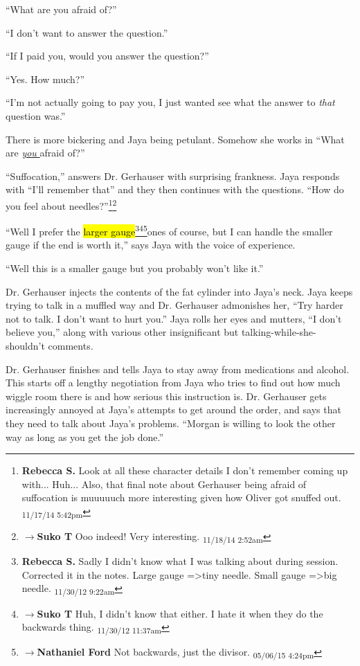 ``What are you afraid of?''

``I don't want to answer the question.''

``If I paid you, would you answer the question?''

``Yes.  How much?''

``I'm not actually going to pay you, I just wanted see what the answer to \textit{that} question was.''

There is more bickering and Jaya being petulant.  Somehow she works in ``What are \underline{\textit{you} } afraid of?''

``Suffocation,'' answers Dr. Gerhauser with surprising frankness.  Jaya responds with ``I'll remember that'' and they then continues with the questions.  ``How do you feel about needles?''\footnote{\textbf{Rebecca S. }Look at all these character details I don't remember coming up with... Huh... 
Also, that final note about Gerhauser being afraid of suffocation is muuuuuch more interesting given how Oliver got snuffed out. \textsubscript{11/17/14 5:42pm}}\footnote{$\rightarrow$\textbf{Suko T }Ooo indeed!  Very interesting. \textsubscript{11/18/14 2:52am}}

``Well I prefer the \hl{larger gauge}\footnote{\textbf{Rebecca S. }Sadly I didn't know what I was talking about during session.  Corrected it in the notes.  Large gauge =\textgreater  tiny needle.  Small gauge =\textgreater  big needle. \textsubscript{11/30/12 9:22am}}\footnote{$\rightarrow$\textbf{Suko T }Huh, I didn't know that either.  I hate it when they do the backwards thing. \textsubscript{11/30/12 11:37am}}\footnote{$\rightarrow$\textbf{Nathaniel Ford }Not backwards, just the divisor. \textsubscript{05/06/15 4:24pm}}ones of course, but I can handle the smaller gauge if the end is worth it,'' says Jaya with the voice of experience.

``Well this is a smaller gauge but you probably won't like it.''



Dr. Gerhauser injects the contents of the fat cylinder into Jaya's neck.  Jaya keeps trying to talk in a muffled way and Dr. Gerhauser admonishes her, ``Try harder not to talk.  I don't want to hurt you.''  Jaya rolls her eyes and mutters, ``I don't believe you,'' along with various other insignificant but talking-while-she-shouldn't comments. 



Dr. Gerhauser finishes and tells Jaya to stay away from medications and alcohol.  This starts off a lengthy negotiation from Jaya who tries to find out how much wiggle room there is and how serious this instruction is. Dr. Gerhauser gets increasingly annoyed at Jaya's attempts to get around the order, and says that they need to talk about Jaya's problems.  ``Morgan is willing to look the other way as long as you get the job done.''

